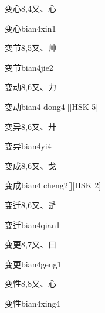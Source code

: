 \begin{entry}{变心}{8,4}{⼜、⼼}
  \begin{phonetics}{变心}{bian4xin1}
  \end{phonetics}
\end{entry}

\begin{entry}{变节}{8,5}{⼜、⾋}
  \begin{phonetics}{变节}{bian4jie2}
  \end{phonetics}
\end{entry}

\begin{entry}{变动}{8,6}{⼜、⼒}
  \begin{phonetics}{变动}{bian4 dong4}[][HSK 5]
  \end{phonetics}
\end{entry}

\begin{entry}{变异}{8,6}{⼜、⼶}
  \begin{phonetics}{变异}{bian4yi4}
  \end{phonetics}
\end{entry}

\begin{entry}{变成}{8,6}{⼜、⼽}
  \begin{phonetics}{变成}{bian4 cheng2}[][HSK 2]
  \end{phonetics}
\end{entry}

\begin{entry}{变迁}{8,6}{⼜、⾡}
  \begin{phonetics}{变迁}{bian4qian1}
  \end{phonetics}
\end{entry}

\begin{entry}{变更}{8,7}{⼜、⽈}
  \begin{phonetics}{变更}{bian4geng1}
  \end{phonetics}
\end{entry}

\begin{entry}{变性}{8,8}{⼜、⼼}
  \begin{phonetics}{变性}{bian4xing4}
  \end{phonetics}
\end{entry}

